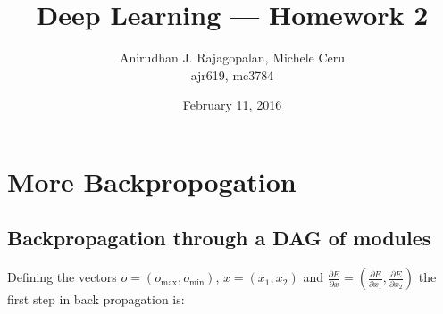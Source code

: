 \documentclass{article}
\begin{document}
\title{Deep Learning --- Homework 2}
\date{February 11, 2016}
\author{Anirudhan J. Rajagopalan, Michele Ceru\\ ajr619, mc3784}

\maketitle

\newpage

\section[Expression for energy]{More Backpropogation}
\subsection{Backpropagation through a DAG of modules}
Defining the vectors $o=(o_{\max},o_{\min})$, $x=(x_1,x_2)$ and $\frac{\partial E}{\partial x} =(\frac{\partial E}{\partial x_1},\frac{\partial E}{\partial x_2}  )$ the first step in back propagation is:
\end{document}
